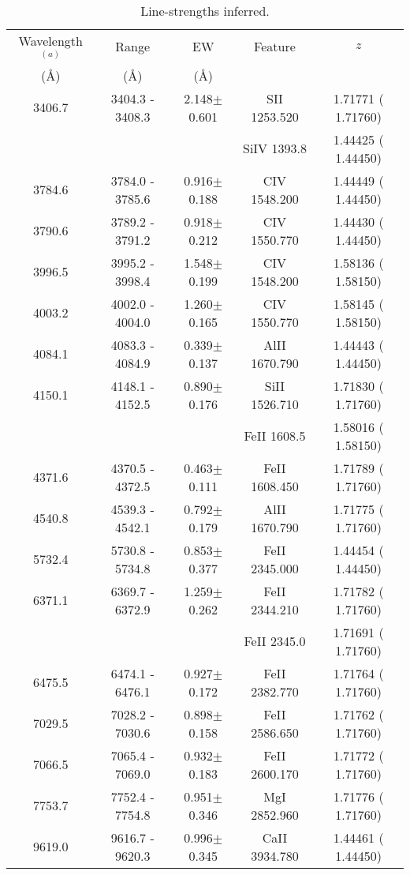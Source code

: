 \begin{table*}
\centering
\begin{center}
\caption{Line-strengths inferred.}
\begin{tabular}{ccccc}
\hline
\noalign{\smallskip}


Wavelength$^{(a)}$& Range             & EW                  &   Feature            & $z$                 \\
({\AA})  & ({\AA})           & ({\AA})             &                      &                     \\
\hline
3406.7 &  3404.3 -  3408.3 &   2.148$\pm$ 0.601  &        SII  1253.520 &  1.71771 ( 1.71760) \\
&                   &                     &         SiIV  1393.8 &  1.44425 ( 1.44450) \\
3784.6 &  3784.0 -  3785.6 &   0.916$\pm$ 0.188  &        CIV  1548.200 &  1.44449 ( 1.44450) \\
3790.6 &  3789.2 -  3791.2 &   0.918$\pm$ 0.212  &        CIV  1550.770 &  1.44430 ( 1.44450) \\
3996.5 &  3995.2 -  3998.4 &   1.548$\pm$ 0.199  &        CIV  1548.200 &  1.58136 ( 1.58150) \\
4003.2 &  4002.0 -  4004.0 &   1.260$\pm$ 0.165  &        CIV  1550.770 &  1.58145 ( 1.58150) \\
4084.1 &  4083.3 -  4084.9 &   0.339$\pm$ 0.137  &       AlII  1670.790 &  1.44443 ( 1.44450) \\
4150.1 &  4148.1 -  4152.5 &   0.890$\pm$ 0.176  &       SiII  1526.710 &  1.71830 ( 1.71760) \\
&                   &                     &         FeII  1608.5 &  1.58016 ( 1.58150) \\
4371.6 &  4370.5 -  4372.5 &   0.463$\pm$ 0.111  &       FeII  1608.450 &  1.71789 ( 1.71760) \\
4540.8 &  4539.3 -  4542.1 &   0.792$\pm$ 0.179  &       AlII  1670.790 &  1.71775 ( 1.71760) \\
\hline
5732.4 &  5730.8 -  5734.8 &   0.853$\pm$ 0.377  &       FeII  2345.000 &  1.44454 ( 1.44450) \\
6371.1 &  6369.7 -  6372.9 &   1.259$\pm$ 0.262  &       FeII  2344.210 &  1.71782 ( 1.71760) \\
&                   &                     &         FeII  2345.0 &  1.71691 ( 1.71760) \\
6475.5 &  6474.1 -  6476.1 &   0.927$\pm$ 0.172  &       FeII  2382.770 &  1.71764 ( 1.71760) \\
7029.5 &  7028.2 -  7030.6 &   0.898$\pm$ 0.158  &       FeII  2586.650 &  1.71762 ( 1.71760) \\
7066.5 &  7065.4 -  7069.0 &   0.932$\pm$ 0.183  &       FeII  2600.170 &  1.71772 ( 1.71760) \\
7753.7 &  7752.4 -  7754.8 &   0.951$\pm$ 0.346  &        MgI  2852.960 &  1.71776 ( 1.71760) \\
9619.0 &  9616.7 -  9620.3 &   0.996$\pm$ 0.345  &       CaII  3934.780 &  1.44461 ( 1.44450) \\



\end{tabular}
\end{center}
\end{table*}
